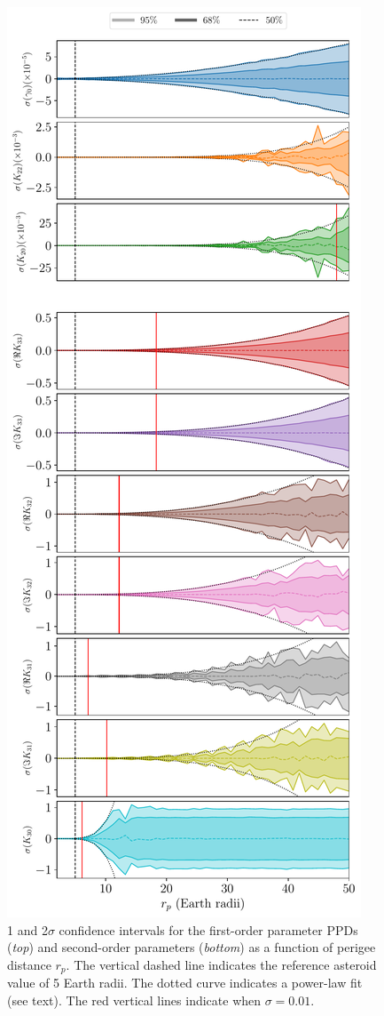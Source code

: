 \documentclass[fleqn,usenatbib]{mnras}
\begin{document}
\begin{figure}
  \centering
  \includegraphics[height=0.89\textheight]{figs/scan-perigee.pdf}
  \caption{1 and 2$\sigma$ confidence intervals for the first-order parameter PPDs (\textit{top}) and second-order parameters (\textit{bottom}) as a function of perigee distance $r_p$. The vertical dashed line indicates the reference asteroid value of 5 Earth radii. The dotted curve indicates a power-law fit (see text). The red vertical lines indicate when $\sigma = 0.01$.}
  \label{fig:scan-perigee}
\end{figure}
\end{document}
